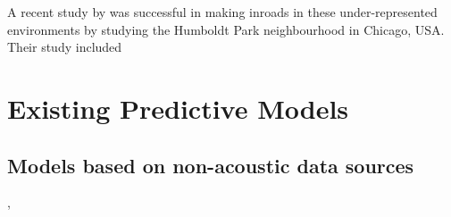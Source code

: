    A recent study by \cite{Kou2020Contexts} was successful in making inroads in these under-represented environments by studying the Humboldt Park neighbourhood in Chicago, USA. Their study included

\section{Existing Predictive Models}

  \citep{Lionello2020Review}

  \subsection{Models based on non-acoustic data sources}
    \citep{Verma2020Predicting}, \citep{Gasco2020Social}
